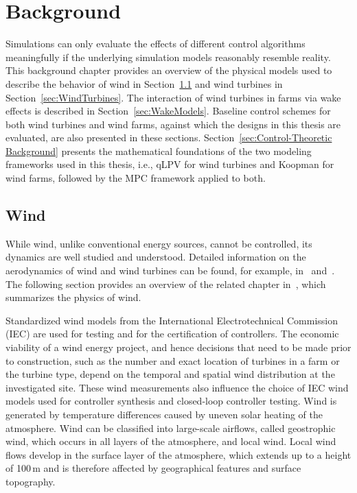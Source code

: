 \chapter{Background} \label{sec:Background}

Simulations can only evaluate the effects of different control algorithms meaningfully if the underlying simulation models reasonably resemble reality. This background chapter provides an overview of the physical models used to describe the behavior of wind in Section~\ref{sec:Wind} and wind turbines in Section~\ref{sec:WindTurbines}. The interaction of wind turbines in farms via wake effects is described in Section~\ref{sec:WakeModels}. Baseline control schemes for both wind turbines and wind farms, against which the designs in this thesis are evaluated, are also presented in these sections. Section~\ref{sec:Control-Theoretic Background} presents the mathematical foundations of the two modeling frameworks used in this thesis, i.e., qLPV for wind turbines and Koopman for wind farms, followed by the MPC framework applied to both.

\section{Wind} \label{sec:Wind}

While wind, unlike conventional energy sources, cannot be controlled, its dynamics are well studied and understood. Detailed information on the aerodynamics of wind and wind turbines can be found, for example, in~\cite{hansen2015aerodynamics} and~\cite{hau20084}. The following section provides an overview of the related chapter in~\cite{Bianchi2007}, which summarizes the physics of wind.

Standardized wind models from the International Electrotechnical Commission (IEC) are used for testing and for the certification of controllers. The economic viability of a wind energy project, and hence decisions that need to be made prior to construction, such as the number and exact location of turbines in a farm or the turbine type, depend on the temporal and spatial wind distribution at the investigated site. These wind measurements also influence the choice of IEC wind models used for controller synthesis and closed-loop controller testing.
%
Wind is generated by temperature differences caused by uneven solar heating of the atmosphere. Wind can be classified into large-scale airflows, called geostrophic wind, which occurs in all layers of the atmosphere, and local wind. Local wind flows develop in the surface layer of the atmosphere, which extends up to a height of 100\,m and is therefore affected by geographical features and surface topography.

